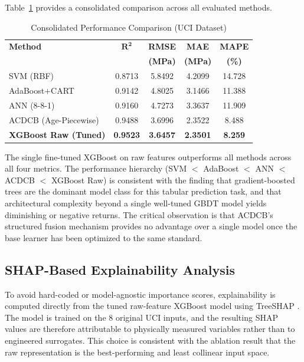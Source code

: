 \documentclass[journal]{IEEEtran}
\begin{document}
Table~\ref{tab:comparison} provides a consolidated comparison across all evaluated methods.

\begin{table}[!t]
\renewcommand{\arraystretch}{1.15}
\caption{Consolidated Performance Comparison (UCI Dataset)}
\label{tab:comparison}
\centering
\footnotesize
\begin{tabular}{lcccc}
\toprule
\textbf{Method} & $\boldsymbol{R^2}$ & \textbf{RMSE} & \textbf{MAE} & \textbf{MAPE} \\
 & & \textbf{(MPa)} & \textbf{(MPa)} & \textbf{(\%)} \\
\midrule
SVM (RBF)                 & 0.8713 & 5.8492 & 4.2099 & 14.728 \\
AdaBoost$+$CART           & 0.9142 & 4.8025 & 3.1466 & 11.388 \\
ANN (8-8-1)               & 0.9160 & 4.7273 & 3.3637 & 11.909 \\
ACDCB (Age-Piecewise)     & 0.9488 & 3.6996 & 2.3522 & 8.488 \\
\textbf{XGBoost Raw (Tuned)} & \textbf{0.9523} & \textbf{3.6457} & \textbf{2.3501} & \textbf{8.259} \\
\bottomrule
\end{tabular}
\end{table}

The single fine-tuned XGBoost on raw features outperforms all methods across all four metrics. The performance hierarchy (SVM $<$ AdaBoost $<$ ANN $<$ ACDCB $<$ XGBoost Raw) is consistent with the finding that gradient-boosted trees are the dominant model class for this tabular prediction task, and that architectural complexity beyond a single well-tuned GBDT model yields diminishing or negative returns. The critical observation is that ACDCB's structured fusion mechanism provides no advantage over a single model once the base learner has been optimized to the same standard.

\subsection{SHAP-Based Explainability Analysis}

To avoid hard-coded or model-agnostic importance scores, explainability is computed directly from the tuned raw-feature XGBoost model using TreeSHAP \cite{lundberg2017unified}. The model is trained on the 8 original UCI inputs, and the resulting SHAP values are therefore attributable to physically measured variables rather than to engineered surrogates. This choice is consistent with the ablation result that the raw representation is the best-performing and least collinear input space.
\end{document}
